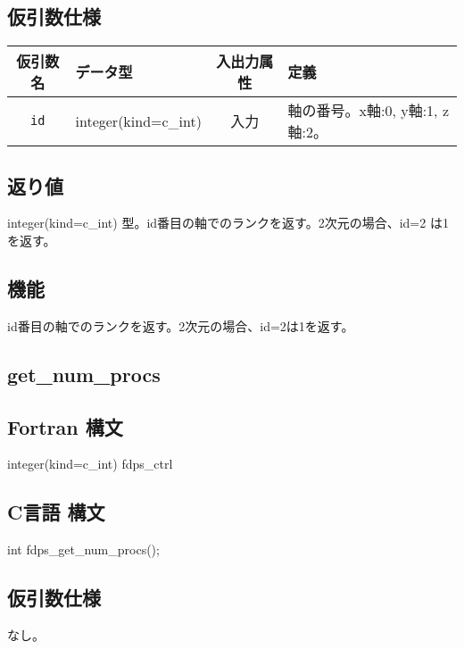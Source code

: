 \subsection*{仮引数仕様}
\begin{table}[h]
\begin{tabularx}{\linewidth}{cXcX}
\toprule
\rowcolor{Snow2}
仮引数名 & データ型 & 入出力属性 & 定義 \\
\midrule
\verb|id| & integer(kind=c\_int) & 入力 & 軸の番号。x軸:0, y軸:1, z軸:2。\\
\bottomrule
\end{tabularx}
\end{table}

\subsection*{返り値}
integer(kind=c\_int) 型。id番目の軸でのランクを返す。2次元の場合、id=2
は1を返す。

\subsection*{機能}
id番目の軸でのランクを返す。2次元の場合、id=2は1を返す。
\clearpage

\subsection{get\_num\_procs}
\subsection*{Fortran 構文}
\begin{screen}
\begin{spverbatim}
integer(kind=c_int) fdps_ctrl%
\end{spverbatim}
\end{screen}

\subsection*{C言語 構文}
\begin{screen}
\begin{spverbatim}
int fdps_get_num_procs();
\end{spverbatim}
\end{screen}

\subsection*{仮引数仕様}
なし。

